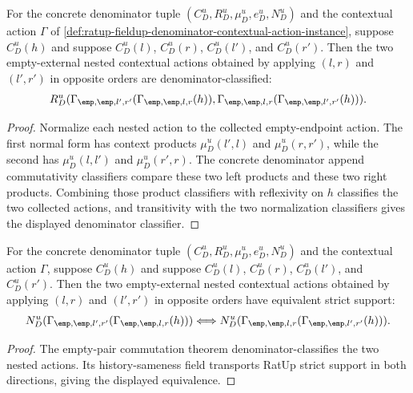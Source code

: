 \begin{theorem}
\label{thm:rat-denom-unit-contextual-action-empty-pair-commutes}
For the concrete denominator tuple
$(C_D^u,R_D^u,\mu_D^u,e_D^u,N_D^u)$ and the contextual action $\Gamma$ of
\autoref{def:ratup-fieldup-denominator-contextual-action-instance}, suppose
$C_D^u(h)$ and suppose $C_D^u(l)$, $C_D^u(r)$, $C_D^u(l')$, and $C_D^u(r')$.
Then the two empty-external nested contextual actions obtained by applying
$(l,r)$ and $(l',r')$ in opposite orders are denominator-classified:
$$
R_D^u(\Gamma_{\emp,\emp,l',r'}(\Gamma_{\emp,\emp,l,r}(h)),
\Gamma_{\emp,\emp,l,r}(\Gamma_{\emp,\emp,l',r'}(h))).
$$
\end{theorem}
\begin{proof}
Normalize each nested action to the collected empty-endpoint action. The first
normal form has context products $\mu_D^u(l',l)$ and $\mu_D^u(r,r')$, while the
second has $\mu_D^u(l,l')$ and $\mu_D^u(r',r)$. The concrete denominator append
commutativity classifiers compare these two left products and these two right
products. Combining those product classifiers with reflexivity on $h$ classifies
the two collected actions, and transitivity with the two normalization
classifiers gives the displayed denominator classifier.
\end{proof}

\begin{theorem}
\label{thm:rat-denom-unit-contextual-action-empty-pair-strict-support-commutes}
For the concrete denominator tuple
$(C_D^u,R_D^u,\mu_D^u,e_D^u,N_D^u)$ and the contextual action $\Gamma$, suppose
$C_D^u(h)$ and suppose $C_D^u(l)$, $C_D^u(r)$, $C_D^u(l')$, and $C_D^u(r')$.
Then the two empty-external nested contextual actions obtained by applying
$(l,r)$ and $(l',r')$ in opposite orders have equivalent strict support:
$$
N_D^u(\Gamma_{\emp,\emp,l',r'}(\Gamma_{\emp,\emp,l,r}(h)))
\Longleftrightarrow
N_D^u(\Gamma_{\emp,\emp,l,r}(\Gamma_{\emp,\emp,l',r'}(h))).
$$
\end{theorem}
\begin{proof}
The empty-pair commutation theorem denominator-classifies the two nested
actions. Its history-sameness field transports RatUp strict support in both
directions, giving the displayed equivalence.
\end{proof}

